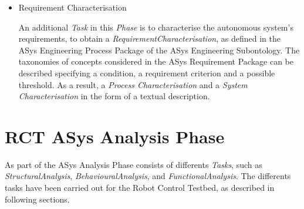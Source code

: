 \begin{itemize}
\item{Requirement Characterisation}

An additional \emph{Task} in this \emph{Phase} is to characterise the autonomous system's requirements, to obtain a \emph{RequirementCharacterisation}, as defined in the  ASys Engineering Process Package of the ASys Engineering Subontology. The taxonomies of concepts considered in the ASys Requirement Package can be described specifying a condition, a requirement criterion and a possible threshold. As a result, a \emph{Process Characterisation} and a \emph{System Characterisation} in the form of a textual description.\\ %
\end{itemize}

\section{RCT ASys Analysis Phase}

As part of the ASys Analysis Phase consists of differents \emph{Tasks}, such as \emph{StructuralAnalysis}, \emph{BehaviouralAnalysis}, and \emph{FunctionalAnalysis}. The differents tasks have been carried out for the Robot Control Testbed, as described in following sections.\\


